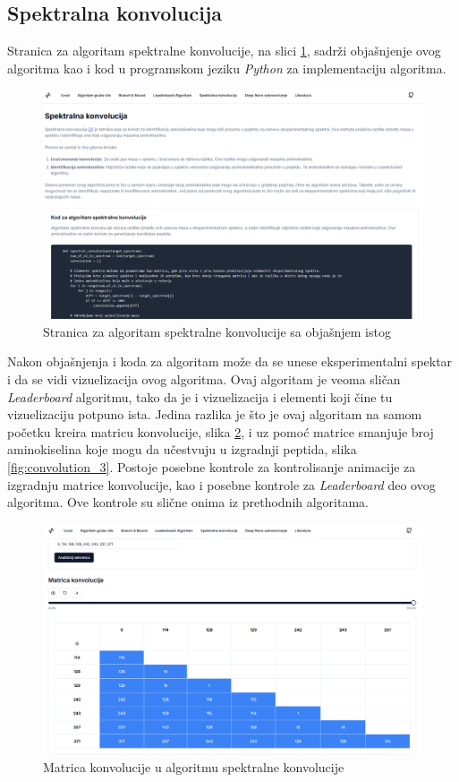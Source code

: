 \documentclass[12pt,oneside]{memoir}
\begin{document}
\subsection{Spektralna konvolucija}
Stranica za algoritam spektralne konvolucije, na slici \ref{fig:convolution_1}, sadrži objašnjenje ovog algoritma kao i kod u programskom jeziku \emph{Python} za implementaciju algoritma.
\begin{figure}[h]
\centering
\includegraphics[width=1\textwidth]{images/convolution_1.png}
\caption{Stranica za algoritam spektralne konvolucije sa objašnjem istog}
\label{fig:convolution_1}
\end{figure}

Nakon objašnjenja i koda za algoritam može da se unese eksperimentalni spektar i da se vidi vizuelizacija ovog algoritma. Ovaj algoritam je veoma sličan \emph{Leaderboard} algoritmu, tako da je i vizuelizacija i elementi koji čine tu vizuelizaciju potpuno ista. Jedina razlika je što je ovaj algoritam na samom početku kreira matricu konvolucije, slika \ref{fig:convolution_2}, i uz pomoć matrice smanjuje broj aminokiselina koje mogu da učestvuju u izgradnji peptida, slika \ref{fig:convolution_3}. Postoje posebne kontrole za kontrolisanje animacije za izgradnju matrice konvolucije, kao i posebne kontrole za \emph{Leaderboard} deo ovog algoritma. Ove kontrole su slične onima iz prethodnih algoritama.

\begin{figure}[H]
\centering
\includegraphics[width=1\textwidth]{images/convolution_2.png}
\caption{Matrica konvolucije u algoritmu spektralne konvolucije}
\label{fig:convolution_2}
\end{figure}
\end{document}
